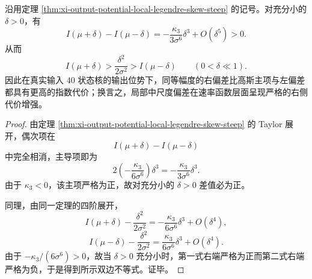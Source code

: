 \begin{corollary}[输出位势局部偏差的严格方向不等式]\label{cor:xi-output-potential-local-legendre-one-sided-asymmetry}
沿用定理 \ref{thm:xi-output-potential-local-legendre-skew-steep} 的记号。对充分小的 \(\delta>0\)，有
\[
\boxed{\;
I(\mu+\delta)-I(\mu-\delta)
=
-\frac{\kappa_3}{3\sigma^6}\delta^3+O(\delta^5)
>0.\;}
\]
从而
\[
\boxed{\;
I(\mu+\delta)>\frac{\delta^2}{2\sigma^2}>I(\mu-\delta)
\qquad(0<\delta\ll1).\;}
\]
因此在真实输入 \(40\) 状态核的输出位势下，同等幅度的右偏差比高斯主项与左偏差都具有更高的指数代价；换言之，局部中尺度偏差在速率函数层面呈现严格的右侧代价增强。
\end{corollary}
\begin{proof}
由定理 \ref{thm:xi-output-potential-local-legendre-skew-steep} 的 Taylor 展开，偶次项在
\[
I(\mu+\delta)-I(\mu-\delta)
\]
中完全相消，主导项即为
\[
2\left(-\frac{\kappa_3}{6\sigma^6}\right)\delta^3
=
-\frac{\kappa_3}{3\sigma^6}\delta^3.
\]
由于 \(\kappa_3<0\)，该主项严格为正，故对充分小的 \(\delta>0\) 差值必为正。
\par
同理，由同一定理的四阶展开，
\[
I(\mu+\delta)-\frac{\delta^2}{2\sigma^2}
=
-\frac{\kappa_3}{6\sigma^6}\delta^3+O(\delta^4),
\]
\[
I(\mu-\delta)-\frac{\delta^2}{2\sigma^2}
=
\frac{\kappa_3}{6\sigma^6}\delta^3+O(\delta^4).
\]
由于
\(
-\kappa_3/(6\sigma^6)>0
\)，故当 \(\delta>0\) 充分小时，第一式右端严格为正而第二式右端严格为负，于是得到所示双边不等式。证毕。
\end{proof}






